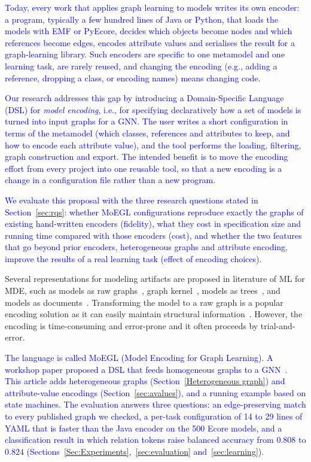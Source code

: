 \documentclass[journal,article,submit,moreauthors,technologies]{Definitions/mdpi}
\newcommand{\rev}[1]{\textcolor{blue}{#1}}
\begin{document}
\rev{Today, every work that applies graph learning to models writes its own encoder: a program, typically a few hundred lines of Java or Python, that loads the models with EMF or PyEcore, decides which objects become nodes and which references become edges, encodes attribute values and serialises the result for a graph-learning library. Such encoders are specific to one metamodel and one learning task, are rarely reused, and changing the encoding (e.g., adding a reference, dropping a class, or encoding names) means changing code.}

\rev{Our research addresses this gap by introducing a Domain-Specific Language (DSL) for \emph{model encoding}, i.e., for specifying declaratively how a set of models is turned into input graphs for a GNN. The user writes a short configuration in terms of the metamodel (which classes, references and attributes to keep, and how to encode each attribute value), and the tool performs the loading, filtering, graph construction and export. The intended benefit is to move the encoding effort from every project into one reusable tool, so that a new encoding is a change in a configuration file rather than a new program.}

\rev{We evaluate this proposal with the three research questions stated in Section~\ref{sec:rqs}: whether MoEGL configurations reproduce exactly the graphs of existing hand-written encoders (fidelity), what they cost in specification size and running time compared with those encoders (cost), and whether the two features that go beyond prior encoders, heterogeneous graphs and attribute encoding, improve the results of a real learning task (effect of encoding choices).}

Several representations for modeling artifacts are proposed in literature of ML for MDE, such as models as raw graphs~\cite{lopez2022generating}, graph kernel~\cite{clariso2018applying}, models as trees~\cite{burgueno2019lstm}, and models as documents~\cite{nguyen2019automated, basciani2016automated}. Transforming the model to a raw graph is a popular encoding solution as it can easily maintain structural information~\cite{ali2023encoding}. However, the encoding is time-consuming and error-prone and it often proceeds by trial-and-error.

\rev{The language is called MoEGL (Model Encoding for Graph Learning). A workshop paper proposed a DSL that feeds homogeneous graphs to a GNN~\cite{rajaei2021dsl}. This article adds heterogeneous graphs (Section~\ref{Heterogeneous graph}) and attribute-value encodings (Section~\ref{sec:avalues}), and a running example based on state machines. The evaluation answers three questions: an edge-preserving match to every published graph we checked, a per-task configuration of 14 to 29 lines of YAML that is faster than the Java encoder on the 500 Ecore models, and a classification result in which relation tokens raise balanced accuracy from $0.808$ to $0.824$ (Sections~\ref{Sec:Experiments},~\ref{sec:evaluation} and~\ref{sec:learning}).}
\end{document}
